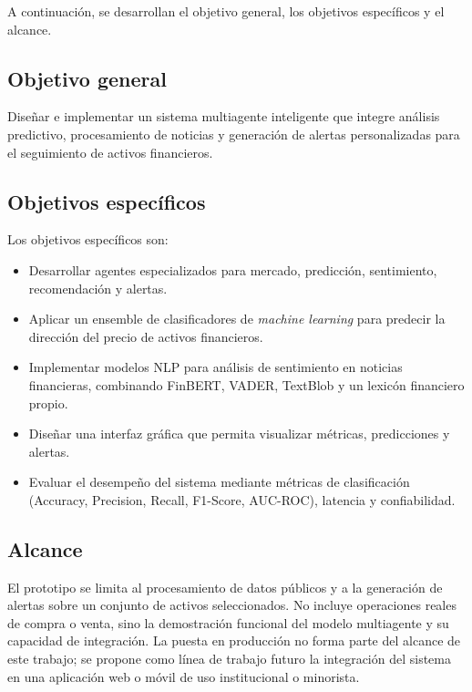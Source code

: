   A continuación, se desarrollan el objetivo general, los objetivos específicos y el
  alcance.

  \subsection{Objetivo general}

  Diseñar e implementar un sistema multiagente inteligente que integre análisis
  predictivo, procesamiento de noticias y generación de alertas personalizadas para
  el seguimiento de activos financieros.

  \subsection{Objetivos específicos}

  Los objetivos específicos son:
  \begin{itemize}
      \item Desarrollar agentes especializados para mercado, predicción, sentimiento,
      recomendación y alertas.
      \item Aplicar un ensemble de clasificadores de \textit{machine learning} para
      predecir la dirección del precio de activos financieros.
      \item Implementar modelos NLP para análisis de sentimiento en noticias financieras,     
      combinando FinBERT, VADER, TextBlob y un lexicón financiero propio.
      \item Diseñar una interfaz gráfica que permita visualizar métricas, predicciones        
      y alertas.
      \item Evaluar el desempeño del sistema mediante métricas de clasificación
      (Accuracy, Precision, Recall, F1-Score, AUC-ROC), latencia y confiabilidad.
  \end{itemize}

  \subsection{Alcance}

  El prototipo se limita al procesamiento de datos públicos y a la generación de
  alertas sobre un conjunto de activos seleccionados. No incluye operaciones reales
  de compra o venta, sino la demostración funcional del modelo multiagente y su
  capacidad de integración. La puesta en producción no forma parte del alcance de
  este trabajo; se propone como línea de trabajo futuro la integración del sistema
  en una aplicación web o móvil de uso institucional o minorista.

